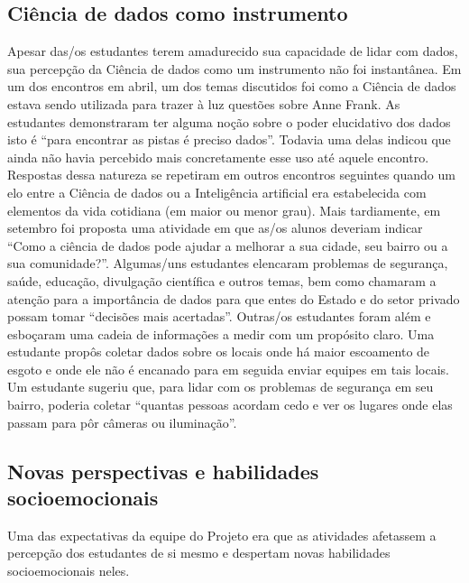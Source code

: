 \documentclass[
]{book}
\begin{document}
\hypertarget{ciuxeancia-de-dados-como-instrumento}{%
\subsection{Ciência de dados como instrumento}\label{ciuxeancia-de-dados-como-instrumento}}

Apesar das/os estudantes terem amadurecido sua capacidade de lidar com dados, sua percepção da Ciência de dados como um instrumento não foi instantânea.
Em um dos encontros em abril, um dos temas discutidos foi como a Ciência de dados estava sendo utilizada para trazer à luz questões sobre Anne Frank. As estudantes demonstraram ter alguma noção sobre o poder elucidativo dos dados isto é ``para encontrar as pistas é preciso dados''. Todavia uma delas indicou que ainda não havia percebido mais concretamente esse uso até aquele encontro. Respostas dessa natureza se repetiram em outros encontros seguintes quando um elo entre a Ciência de dados ou a Inteligência artificial era estabelecida com elementos da vida cotidiana (em maior ou menor grau).
Mais tardiamente, em setembro foi proposta uma atividade em que as/os alunos deveriam indicar ``Como a ciência de dados pode ajudar a melhorar a sua cidade, seu bairro ou a sua comunidade?''. Algumas/uns estudantes elencaram problemas de segurança, saúde, educação, divulgação científica e outros temas, bem como chamaram a atenção para a importância de dados para que entes do Estado e do setor privado possam tomar ``decisões mais acertadas''.
Outras/os estudantes foram além e esboçaram uma cadeia de informações a medir com um propósito claro. Uma estudante propôs coletar dados sobre os locais onde há maior escoamento de esgoto e onde ele não é encanado para em seguida enviar equipes em tais locais. Um estudante sugeriu que, para lidar com os problemas de segurança em seu bairro, poderia coletar ``quantas pessoas acordam cedo e ver os lugares onde elas passam para pôr câmeras ou iluminação''.

\hypertarget{novas-perspectivas-e-habilidades-socioemocionais}{%
\subsection{Novas perspectivas e habilidades socioemocionais}\label{novas-perspectivas-e-habilidades-socioemocionais}}

Uma das expectativas da equipe do Projeto era que as atividades afetassem a percepção dos estudantes de si mesmo e despertam novas habilidades socioemocionais neles.
\end{document}

